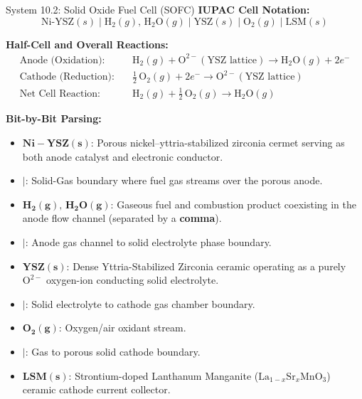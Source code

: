 \documentclass[10pt,a4paper]{article}
\begin{document}
\begin{examplebox}{System 10.2: Solid Oxide Fuel Cell (SOFC)}
\textbf{IUPAC Cell Notation:}
\begin{equation*}
    \text{Ni-YSZ}(s) \mid \text{H}_2(g),\, \text{H}_2\text{O}(g) \mid \text{YSZ}(s) \mid \text{O}_2(g) \mid \text{LSM}(s)
\end{equation*}

\textbf{Half-Cell and Overall Reactions:}
\begin{align*}
    \text{Anode (Oxidation):} \quad & \text{H}_2(g) + \text{O}^{2-}(\text{YSZ lattice}) \longrightarrow \text{H}_2\text{O}(g) + 2e^- \\
    \text{Cathode (Reduction):} \quad & \tfrac{1}{2}\,\text{O}_2(g) + 2e^- \longrightarrow \text{O}^{2-}(\text{YSZ lattice}) \\
    \text{Net Cell Reaction:} \quad & \text{H}_2(g) + \tfrac{1}{2}\,\text{O}_2(g) \longrightarrow \text{H}_2\text{O}(g)
\end{align*}

\textbf{Bit-by-Bit Parsing:}
\begin{itemize}[leftmargin=*]
    \item $\mathbf{Ni-YSZ(s)}$: Porous nickel--yttria-stabilized zirconia cermet serving as both anode catalyst and electronic conductor.
    \item $\mathbf{\mid}$: Solid-Gas boundary where fuel gas streams over the porous anode.
    \item $\mathbf{H_2(g),\, H_2O(g)}$: Gaseous fuel and combustion product coexisting in the anode flow channel (separated by a \textbf{comma}).
    \item $\mathbf{\mid}$: Anode gas channel to solid electrolyte phase boundary.
    \item $\mathbf{YSZ(s)}$: Dense Yttria-Stabilized Zirconia ceramic operating as a purely $\text{O}^{2-}$ oxygen-ion conducting solid electrolyte.
    \item $\mathbf{\mid}$: Solid electrolyte to cathode gas chamber boundary.
    \item $\mathbf{O_2(g)}$: Oxygen/air oxidant stream.
    \item $\mathbf{\mid}$: Gas to porous solid cathode boundary.
    \item $\mathbf{LSM(s)}$: Strontium-doped Lanthanum Manganite ($\text{La}_{1-x}\text{Sr}_x\text{MnO}_3$) ceramic cathode current collector.
\end{itemize}
\end{examplebox}
\end{document}
